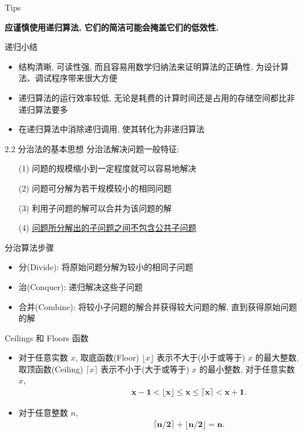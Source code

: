 \documentclass[fontset=fandol,UTF8,fleqn]{beamer}
\begin{document}
\begin{frame}{Tips}
\begin{center}
\huge{\textbf{应谨慎使用递归算法, 它们的简洁可能会掩盖它们的低效性.}}
\end{center}
\end{frame}

\begin{frame}{递归小结}
\begin{itemize}[<+-|alert@+>]
\item 结构清晰, 可读性强, 而且容易用数学归纳法来证明算法的正确性, 为设计算法、调试程序带来很大方便   
\item 递归算法的运行效率较低,  无论是耗费的计算时间还是占用的存储空间都比非递归算法要多   
\item 在递归算法中消除递归调用,  使其转化为非递归算法   
\end{itemize}
\end{frame}

\begin{frame}{2.2 分治法的基本思想}
分治法解决问题一般特征: 
\begin{itemize}[<+-|alert@+>]
\item[(1)]问题的规模缩小到一定程度就可以容易地解决 
\item[(2)] 问题可分解为若干规模较小的相同问题 
\item[(3)] 利用子问题的解可以合并为该问题的解 
\item[(4)] \underline{问题所分解出的子问题之间不包含公共子问题}   
\end{itemize}
\end{frame}

\begin{frame}{分治算法步骤}
\begin{itemize}[<+-|alert@+>]
\item 分(Divide): 将原始问题分解为较小的相同子问题 
\item 治(Conquer): 递归解决这些子问题 
\item 合并(Combine): 将较小子问题的解合并获得较大问题的解, 直到获得原始问题的解  
\end{itemize}
\end{frame}

\begin{frame}{Ceilings 和 Floors 函数}
\begin{itemize}[<+-|alert@+>]
\item 对于任意实数 $x$, 取底函数(Floor) $\lfloor x \rfloor$ 表示不大于(小于或等于) $x$ 的最大整数, 取顶函数(Ceiling) $\lceil x \rceil$ 表示不小于(大于或等于)
  $x$ 的最小整数, 对于任意实数 $x$,
  \begin{eqnarray*}
    \hspace{3cm}
\boldsymbol{  x - 1 < \lfloor x \rfloor \leq  x \leq \lceil  x \rceil  < x +1}.
\end{eqnarray*}
\item 对于任意整数 $n$,
  \begin{eqnarray*}
        \hspace{3cm}
\boldsymbol{  \lceil n/2 \rceil  + \lfloor n/2 \rfloor = n}.
\end{eqnarray*}
\end{itemize}
\end{frame}
\end{document}
